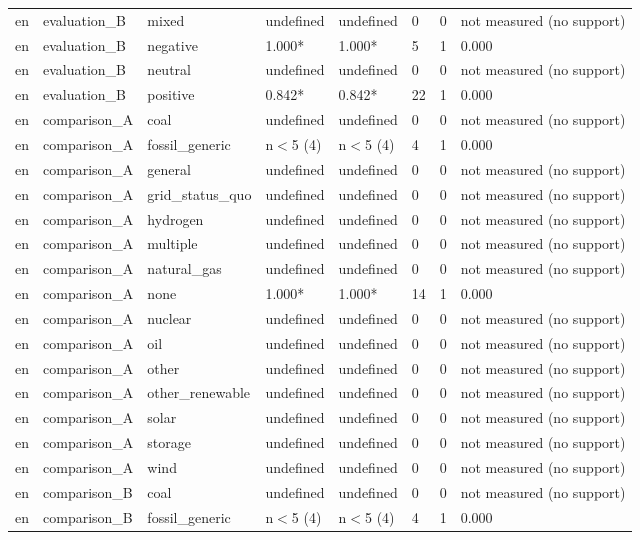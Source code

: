 \begin{table}[htbp]
\begin{tabular}{llllllll}
en & evaluation\_B & mixed & undefined & undefined & 0 & 0 & not measured (no support) \\
en & evaluation\_B & negative & 1.000* & 1.000* & 5 & 1 & 0.000 \\
en & evaluation\_B & neutral & undefined & undefined & 0 & 0 & not measured (no support) \\
en & evaluation\_B & positive & 0.842* & 0.842* & 22 & 1 & 0.000 \\
en & comparison\_A & coal & undefined & undefined & 0 & 0 & not measured (no support) \\
en & comparison\_A & fossil\_generic & n$<$5 (4) & n$<$5 (4) & 4 & 1 & 0.000 \\
en & comparison\_A & general & undefined & undefined & 0 & 0 & not measured (no support) \\
en & comparison\_A & grid\_status\_quo & undefined & undefined & 0 & 0 & not measured (no support) \\
en & comparison\_A & hydrogen & undefined & undefined & 0 & 0 & not measured (no support) \\
en & comparison\_A & multiple & undefined & undefined & 0 & 0 & not measured (no support) \\
en & comparison\_A & natural\_gas & undefined & undefined & 0 & 0 & not measured (no support) \\
en & comparison\_A & none & 1.000* & 1.000* & 14 & 1 & 0.000 \\
en & comparison\_A & nuclear & undefined & undefined & 0 & 0 & not measured (no support) \\
en & comparison\_A & oil & undefined & undefined & 0 & 0 & not measured (no support) \\
en & comparison\_A & other & undefined & undefined & 0 & 0 & not measured (no support) \\
en & comparison\_A & other\_renewable & undefined & undefined & 0 & 0 & not measured (no support) \\
en & comparison\_A & solar & undefined & undefined & 0 & 0 & not measured (no support) \\
en & comparison\_A & storage & undefined & undefined & 0 & 0 & not measured (no support) \\
en & comparison\_A & wind & undefined & undefined & 0 & 0 & not measured (no support) \\
en & comparison\_B & coal & undefined & undefined & 0 & 0 & not measured (no support) \\
en & comparison\_B & fossil\_generic & n$<$5 (4) & n$<$5 (4) & 4 & 1 & 0.000 \\

\end{tabular}
\end{table}
